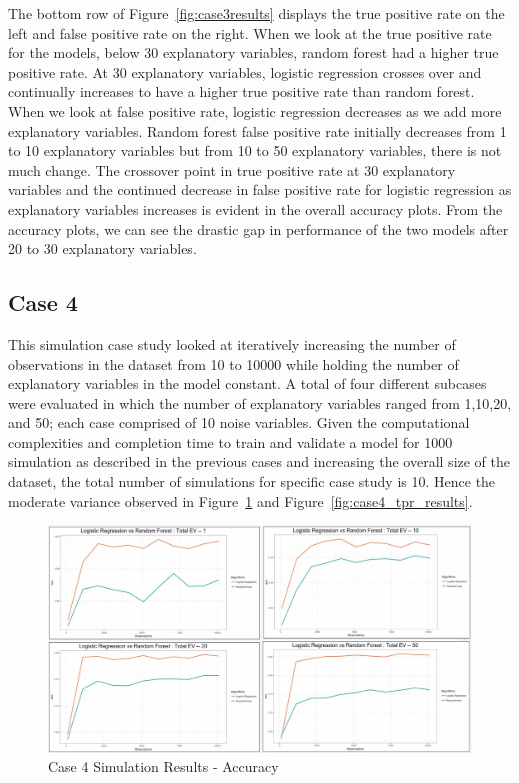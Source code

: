 \documentclass{llncs}
\begin{document}
The bottom row of Figure~\ref{fig:case3results} displays the true positive rate on the left and false positive rate on the right.  When we look at the true positive rate for the models, below 30 explanatory variables, random forest had a higher true positive rate.  At 30 explanatory variables, logistic regression crosses over and continually increases to have a higher true positive rate than random forest.  When we look at false positive rate, logistic regression decreases as we add more explanatory variables.  Random forest false positive rate initially decreases from 1 to 10 explanatory variables but from 10 to 50 explanatory variables, there is not much change.  The crossover point in true positive rate at 30 explanatory variables and the continued decrease in false positive rate for logistic regression as explanatory variables increases is evident in the overall accuracy plots.  From the accuracy plots, we can see the drastic gap in performance of the two models after 20 to 30 explanatory variables.


\subsection{Case 4}
This simulation case study looked at iteratively increasing the number of observations in the dataset from 10 to 10000 while holding the number of explanatory variables in the model constant. A total of four different subcases were evaluated in which the number of explanatory variables ranged from 1,10,20, and 50; each case comprised of 10 noise variables. Given the computational complexities and completion time to train and validate a model for 1000 simulation as described in the previous cases and increasing the overall size of the dataset, the total number of simulations for specific case study is 10. Hence the moderate variance observed in Figure~\ref{fig:case4_acc_results} and Figure~\ref{fig:case4_tpr_results}. 

\begin{figure}
\centering
\includegraphics[scale=0.55]{case4_acc.png}
\caption{Case 4 Simulation Results - Accuracy}
\label{fig:case4_acc_results}
\end{figure}
\end{document}
